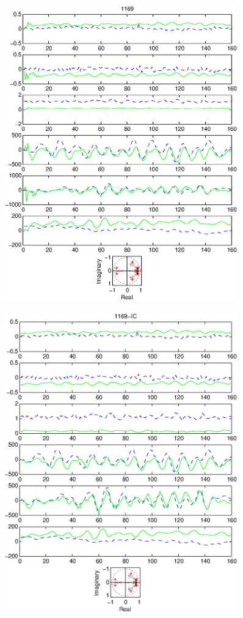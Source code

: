\documentclass{article}
\begin{document}
\begin{figure}[htb!]
\centering
\includegraphics[width=0.9\textwidth]{1169.eps}
\end{figure}\clearpage
\begin{figure}[htb!]
\centering
\includegraphics[width=0.9\textwidth]{1169_ic.eps}
\end{figure}\clearpage
\end{document}
